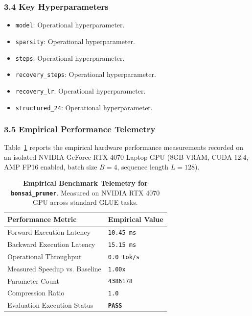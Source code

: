 \subsubsection*{3.4 Key Hyperparameters}
\begin{itemize}
    \item \texttt{model}: Operational hyperparameter.
    \item \texttt{sparsity}: Operational hyperparameter.
    \item \texttt{steps}: Operational hyperparameter.
    \item \texttt{recovery\_steps}: Operational hyperparameter.
    \item \texttt{recovery\_lr}: Operational hyperparameter.
    \item \texttt{structured\_24}: Operational hyperparameter.
\end{itemize}

\subsubsection*{3.5 Empirical Performance Telemetry}
Table~\ref{tab:telemetry_bonsai_pruner} reports the empirical hardware performance measurements recorded on an isolated NVIDIA GeForce RTX 4070 Laptop GPU (8GB VRAM, CUDA 12.4, AMP FP16 enabled, batch size $B=4$, sequence length $L=128$).

\begin{table}[h]
\centering
\small
\caption{\textbf{Empirical Benchmark Telemetry for \texttt{bonsai\_pruner}}. Measured on NVIDIA RTX 4070 GPU across standard GLUE tasks.}
\label{tab:telemetry_bonsai_pruner}
\begin{tabularx}{\columnwidth}{lX}
\toprule
\textbf{Performance Metric} & \textbf{Empirical Value} \\
\midrule
Forward Execution Latency & \texttt{10.45 ms} \\
Backward Execution Latency & \texttt{15.15 ms} \\
Operational Throughput & \texttt{0.0 tok/s} \\
Measured Speedup vs. Baseline & \texttt{1.00x} \\
Parameter Count & \texttt{4386178} \\
Compression Ratio & \texttt{1.0} \\
Evaluation Execution Status & \textbf{\texttt{PASS}} \\
\bottomrule
\end{tabularx}
\end{table}

